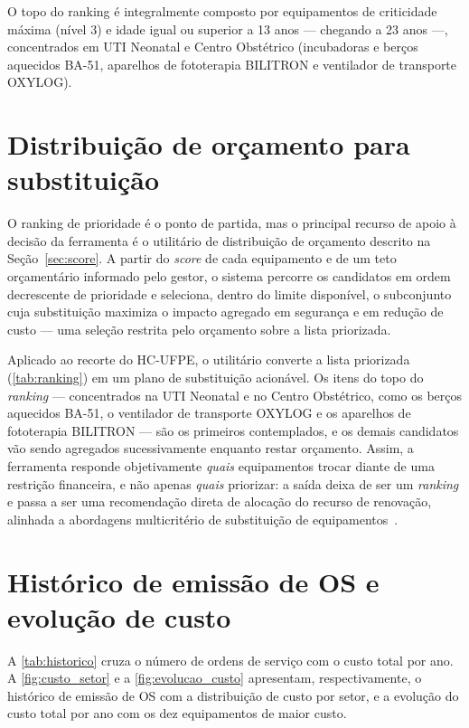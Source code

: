 O topo do ranking é integralmente composto por equipamentos de criticidade máxima
(nível 3) e idade igual ou superior a 13 anos --- chegando a 23 anos ---,
concentrados em UTI Neonatal e Centro Obstétrico (incubadoras e berços aquecidos
BA-51, aparelhos de fototerapia BILITRON e ventilador de transporte OXYLOG).

\section{Distribuição de orçamento para substituição}
\label{sec:result_orcamento}

O ranking de prioridade é o ponto de partida, mas o principal recurso de apoio à
decisão da ferramenta é o utilitário de distribuição de orçamento descrito na
Seção~\ref{sec:score}. A partir do \textit{score} de cada equipamento e de um teto
orçamentário informado pelo gestor, o sistema percorre os candidatos em ordem
decrescente de prioridade e seleciona, dentro do limite disponível, o subconjunto
cuja substituição maximiza o impacto agregado em segurança e em redução de custo
--- uma seleção restrita pelo orçamento sobre a lista priorizada.

Aplicado ao recorte do HC-UFPE, o utilitário converte a lista priorizada
(\ref{tab:ranking}) em um plano de substituição acionável. Os itens do topo
do \textit{ranking} --- concentrados na UTI Neonatal e no Centro Obstétrico, como
os berços aquecidos BA-51, o ventilador de transporte OXYLOG e os aparelhos de
fototerapia BILITRON --- são os primeiros contemplados, e os demais candidatos vão
sendo agregados sucessivamente enquanto restar orçamento. Assim, a ferramenta
responde objetivamente \textit{quais} equipamentos trocar diante de uma restrição
financeira, e não apenas \textit{quais} priorizar: a saída deixa de ser um
\textit{ranking} e passa a ser uma recomendação direta de alocação do recurso de
renovação, alinhada a abordagens multicritério de substituição de
equipamentos~\cite{huang2024transforming,park2025evaluation}.

\section{Histórico de emissão de OS e evolução de custo}

A \ref{tab:historico} cruza o número de ordens de serviço com o custo total
por ano. A \ref{fig:custo_setor} e a \ref{fig:evolucao_custo} apresentam,
respectivamente, o histórico de emissão de OS com a distribuição de custo por
setor, e a evolução do custo total por ano com os dez equipamentos de maior custo.

